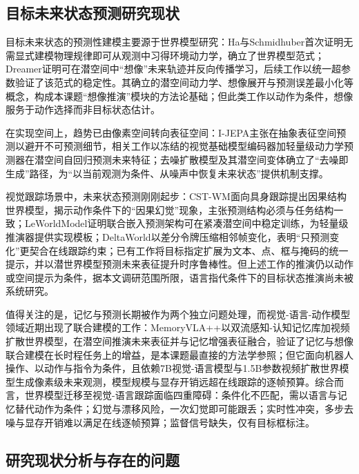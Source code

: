 \subsection{目标未来状态预测研究现状}

目标未来状态的预测性建模主要源于世界模型研究：Ha与Schmidhuber\cite{ha2018worldmodels}首次证明无需显式建模物理规律即可从观测中习得环境动力学，确立了世界模型范式；Dreamer\cite{hafner2020dreamer}证明可在潜空间中“想像”未来轨迹并反向传播学习，后续工作以统一超参数验证了该范式的稳定性\cite{hafner2025mastering}。其确立的潜空间动力学、想像展开与预测误差最小化等概念，构成本课题“想像推演”模块的方法论基础；但此类工作以动作为条件，想像服务于动作选择而非目标状态估计。

在实现空间上，趋势已由像素空间转向表征空间：I-JEPA\cite{assran2023ijepa}主张在抽象表征空间预测以避开不可预测细节，相关工作以冻结的视觉基础模型编码器加轻量级动力学预测器在潜空间自回归预测未来特征；去噪扩散模型及其潜空间变体确立了“去噪即生成”路径\cite{ho2020ddpm,rombach2022ldm}，为“以当前观测为条件、从噪声中恢复未来状态”提供机制支撑。

视觉跟踪场景中，未来状态预测刚刚起步：CST-WM\cite{hu2026cstwm}面向具身跟踪提出因果结构世界模型，揭示动作条件下的“因果幻觉”现象，主张预测结构必须与任务结构一致；LeWorldModel\cite{maes2026leworldmodel}证明联合嵌入预测架构可在紧凑潜空间中稳定训练，为轻量级推演器提供实现模板；DeltaWorld\cite{kerssies2026delta}以差分令牌压缩相邻帧变化，表明“只预测变化”更契合在线跟踪约束；已有工作将目标指定扩展为文本、点、框与掩码的统一提示，并以潜世界模型预测未来表征提升时序鲁棒性\cite{xie2026uss}。但上述工作的推演仍以动作或空间提示为条件，据本文调研范围所限，语言指代条件下的目标状态推演尚未被系统研究。

值得关注的是，记忆与预测长期被作为两个独立问题处理，而视觉-语言-动作模型领域近期出现了联合建模的工作：MemoryVLA++\cite{shi2026memoryvla}以双流感知-认知记忆库加视频扩散世界模型，在潜空间推演未来表征并与记忆增强表征融合，验证了记忆与想像联合建模在长时程任务上的增益，是本课题最直接的方法学参照；但它面向机器人操作、以动作与指令为条件，且依赖7B视觉-语言模型与1.5B参数视频扩散世界模型生成像素级未来观测，模型规模与显存开销远超在线跟踪的逐帧预算。综合而言，世界模型迁移至视觉-语言跟踪面临四重障碍：条件化不匹配，需以语言与记忆替代动作为条件；幻觉与漂移风险，一次幻觉即可能跟丢；实时性冲突，多步去噪与显存开销难以满足在线逐帧预算；监督信号缺失，仅有目标框标注。

\subsection{研究现状分析与存在的问题}

